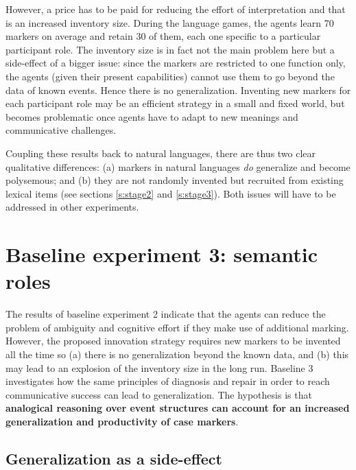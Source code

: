 \largerpage
However, a price has to be paid for reducing the effort of interpretation and that is an increased inventory size. During the language games, the agents learn 70 markers on average and retain 30 of them, each one specific to a particular participant role. The inventory size is in fact not the main problem here but a side-effect of a bigger issue: since the markers are restricted to one function only, the agents (given their present capabilities) cannot use them to go beyond the data of known events. Hence there is no generalization. Inventing new markers for each participant role may be an efficient strategy in a small and fixed world, but becomes problematic once agents have to adapt to new meanings and communicative challenges.

Coupling these results back to natural languages, there are thus two clear qualitative differences: (a) markers in natural languages {\em do} generalize and become polysemous; and (b) they are not randomly invented but recruited from existing lexical items (see sections \ref{s:stage2} and \ref{s:stage3}). Both issues will have to be addressed in other experiments.


\section{Baseline experiment 3: semantic roles}
\label{s:base3}

The results of baseline experiment 2 indicate that the agents can reduce the problem of ambiguity and cognitive effort if they make use of additional marking. However, the proposed innovation strategy requires new markers to be invented all the time so (a) there is no generalization beyond the known data, and (b) this may lead to an explosion of the inventory size in the long run. Baseline 3 investigates how the same principles of diagnosis and repair in order to reach communicative success can lead to generalization. The hypothesis is that {\bfseries analogical reasoning over event structures can account for an increased generalization and productivity of case markers}.

\subsection{Generalization as a side-effect}

